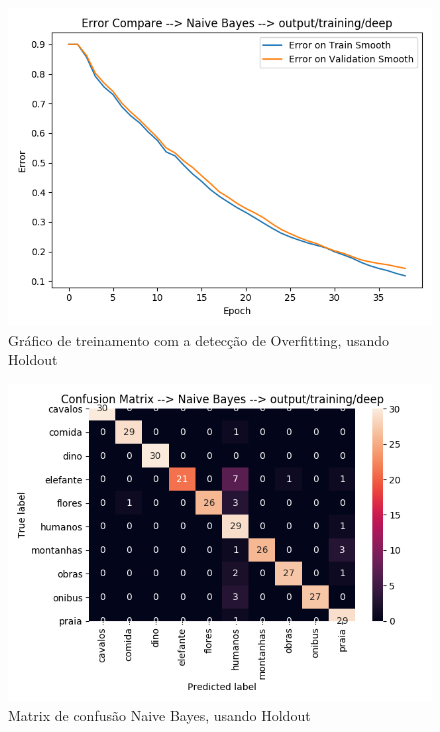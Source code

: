 \documentclass[
article,			%
11pt,				%
oneside,			%
a4paper,			%
english,			%
brazil,				%
sumario=tradicional,
]{abntex2}
\begin{document}
\begin{anexosenv}
		
		\begin{figure}[htb]
			\caption{\label{without_overfitting}Gráfico de treinamento com a detecção de  Overfitting, usando Holdout}
			\begin{center}
				\includegraphics[scale=0.5]{without_overfitting.png}
			\end{center}
		\end{figure}
	
		\begin{figure}[htb]
			\caption{\label{confusion-matrix-naive-holdout-deep}Matrix de confusão Naive Bayes, usando Holdout}
			\begin{center}
				\includegraphics[scale=0.5]{confusion-matrix-naive-holdout-deep.png}
			\end{center}
		\end{figure}
	

\end{anexosenv}
\end{document}
